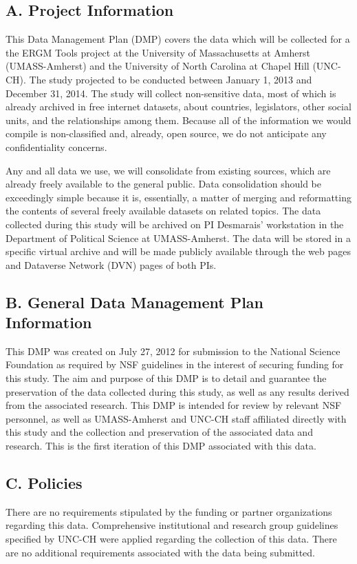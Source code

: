 


\subsection*{A. Project Information}
This Data Management Plan (DMP) covers the data which will be collected for a the ERGM Tools project at the University of Massachusetts at Amherst (UMASS-Amherst) and the University of North Carolina at Chapel Hill (UNC-CH). The study projected to be conducted between January 1, 2013 and December 31, 2014. The study will collect non-sensitive data, most of which is already archived in free internet datasets, about countries, legislators, other social units, and the relationships among them. Because all of the information we would compile is non-classified and, already, open source, we do not anticipate any confidentiality concerns. 

Any and all data we use, we will consolidate from existing sources, which are already freely available to the general public. Data consolidation should be exceedingly simple because it is, essentially, a matter of merging and reformatting the contents of several freely available datasets on related topics. The data collected during this study will be archived on PI Desmarais' workstation in the Department of Political Science at UMASS-Amherst. The data will be stored in a specific virtual archive and will be made publicly available through the web pages and Dataverse Network (DVN) pages of both PIs.


\subsection*{B. General Data Management Plan Information }
This DMP was created on July 27, 2012 for submission to the National Science Foundation as
required by NSF guidelines in the interest of securing funding for this study. The aim and purpose of this DMP is to detail and guarantee the preservation of the data collected during this study, as well as any results derived from the associated research. This DMP is intended for review by relevant NSF
personnel, as well as UMASS-Amherst and UNC-CH staff affiliated directly with this study and the collection and preservation of the associated data and research. This is the first iteration of this DMP associated with this data.

\subsection*{C. Policies }
There are no requirements stipulated by the funding or partner organizations regarding this data.
Comprehensive institutional and research group guidelines specified by UNC-CH were applied regarding the collection of this data. There are no additional requirements associated with the data being submitted.

